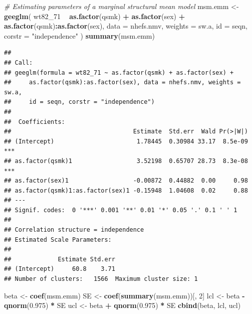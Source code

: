 \documentclass[
  10pt,
]{book}
\newenvironment{Shaded}{\begin{snugshade}}{\end{snugshade}}
\newcommand{\CommentTok}[1]{\textcolor[rgb]{0.56,0.35,0.01}{\textit{#1}}}
\newcommand{\DataTypeTok}[1]{\textcolor[rgb]{0.13,0.29,0.53}{#1}}
\newcommand{\DecValTok}[1]{\textcolor[rgb]{0.00,0.00,0.81}{#1}}
\newcommand{\FloatTok}[1]{\textcolor[rgb]{0.00,0.00,0.81}{#1}}
\newcommand{\KeywordTok}[1]{\textcolor[rgb]{0.13,0.29,0.53}{\textbf{#1}}}
\newcommand{\NormalTok}[1]{#1}
\newcommand{\OperatorTok}[1]{\textcolor[rgb]{0.81,0.36,0.00}{\textbf{#1}}}
\newcommand{\StringTok}[1]{\textcolor[rgb]{0.31,0.60,0.02}{#1}}
\begin{document}
\begin{Shaded}
\begin{Highlighting}[]
\CommentTok{# Estimating parameters of a marginal structural mean model}
\NormalTok{msm.emm <-}\StringTok{ }\KeywordTok{geeglm}\NormalTok{(}
\NormalTok{  wt82_}\DecValTok{71} \OperatorTok{~}\StringTok{ }\KeywordTok{as.factor}\NormalTok{(qsmk) }\OperatorTok{+}\StringTok{ }\KeywordTok{as.factor}\NormalTok{(sex)}
  \OperatorTok{+}\StringTok{ }\KeywordTok{as.factor}\NormalTok{(qsmk)}\OperatorTok{:}\KeywordTok{as.factor}\NormalTok{(sex),}
  \DataTypeTok{data =}\NormalTok{ nhefs.nmv,}
  \DataTypeTok{weights =}\NormalTok{ sw.a,}
  \DataTypeTok{id =}\NormalTok{ seqn,}
  \DataTypeTok{corstr =} \StringTok{"independence"}
\NormalTok{)}
\KeywordTok{summary}\NormalTok{(msm.emm)}
\end{Highlighting}
\end{Shaded}

\begin{verbatim}
## 
## Call:
## geeglm(formula = wt82_71 ~ as.factor(qsmk) + as.factor(sex) + 
##     as.factor(qsmk):as.factor(sex), data = nhefs.nmv, weights = sw.a, 
##     id = seqn, corstr = "independence")
## 
##  Coefficients:
##                                  Estimate  Std.err  Wald Pr(>|W|)    
## (Intercept)                       1.78445  0.30984 33.17  8.5e-09 ***
## as.factor(qsmk)1                  3.52198  0.65707 28.73  8.3e-08 ***
## as.factor(sex)1                  -0.00872  0.44882  0.00     0.98    
## as.factor(qsmk)1:as.factor(sex)1 -0.15948  1.04608  0.02     0.88    
## ---
## Signif. codes:  0 '***' 0.001 '**' 0.01 '*' 0.05 '.' 0.1 ' ' 1
## 
## Correlation structure = independence 
## Estimated Scale Parameters:
## 
##             Estimate Std.err
## (Intercept)     60.8    3.71
## Number of clusters:   1566  Maximum cluster size: 1
\end{verbatim}

\begin{Shaded}
\begin{Highlighting}[]
\NormalTok{beta <-}\StringTok{ }\KeywordTok{coef}\NormalTok{(msm.emm)}
\NormalTok{SE <-}\StringTok{ }\KeywordTok{coef}\NormalTok{(}\KeywordTok{summary}\NormalTok{(msm.emm))[, }\DecValTok{2}\NormalTok{]}
\NormalTok{lcl <-}\StringTok{ }\NormalTok{beta }\OperatorTok{-}\StringTok{ }\KeywordTok{qnorm}\NormalTok{(}\FloatTok{0.975}\NormalTok{) }\OperatorTok{*}\StringTok{ }\NormalTok{SE}
\NormalTok{ucl <-}\StringTok{ }\NormalTok{beta }\OperatorTok{+}\StringTok{ }\KeywordTok{qnorm}\NormalTok{(}\FloatTok{0.975}\NormalTok{) }\OperatorTok{*}\StringTok{ }\NormalTok{SE}
\KeywordTok{cbind}\NormalTok{(beta, lcl, ucl)}
\end{Highlighting}
\end{Shaded}
\end{document}
